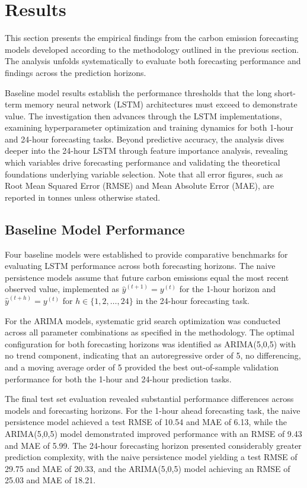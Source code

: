 \thispagestyle{plain}
\section{Results}
\label{sec:results}

This section presents the empirical findings from the carbon emission forecasting models developed according to the methodology outlined in the previous section. The analysis unfolds systematically to evaluate both forecasting performance and findings across the prediction horizons.

Baseline model results establish the performance thresholds that the long short-term memory neural network (LSTM) architectures must exceed to demonstrate value. The investigation then advances through the LSTM implementations, examining hyperparameter optimization and training dynamics for both 1-hour and 24-hour forecasting tasks. Beyond predictive accuracy, the analysis dives deeper into the 24-hour LSTM through feature importance analysis, revealing which variables drive forecasting performance and validating the theoretical foundations underlying variable selection. Note that all error figures, such as Root Mean Squared Error (RMSE) and Mean Absolute Error (MAE), are reported in tonnes \cotwoe{} unless otherwise stated.

\subsection{Baseline Model Performance}

Four baseline models were established to provide comparative benchmarks for evaluating LSTM performance across both forecasting horizons. The naive persistence models assume that future carbon emissions equal the most recent observed value, implemented as \(\hat{y}^{(t+1)} = y^{(t)}\) for the 1-hour horizon and \(\hat{y}^{(t+h)} = y^{(t)}\) for \(h \in \{1, 2, \ldots, 24\}\) in the 24-hour forecasting task.

For the ARIMA models, systematic grid search optimization was conducted across all parameter combinations as specified in the methodology. The optimal configuration for both forecasting horizons was identified as ARIMA(5,0,5) with no trend component, indicating that an autoregressive order of 5, no differencing, and a moving average order of 5 provided the best out-of-sample validation performance for both the 1-hour and 24-hour prediction tasks.

The final test set evaluation revealed substantial performance differences across models and forecasting horizons. For the 1-hour ahead forecasting task, the naive persistence model achieved a test RMSE of 10.54 and MAE of 6.13, while the ARIMA(5,0,5) model demonstrated improved performance with an RMSE of 9.43 and MAE of 5.99. The 24-hour forecasting horizon presented considerably greater prediction complexity, with the naive persistence model yielding a test RMSE of 29.75 and MAE of 20.33, and the ARIMA(5,0,5) model achieving an RMSE of 25.03 and MAE of 18.21.

